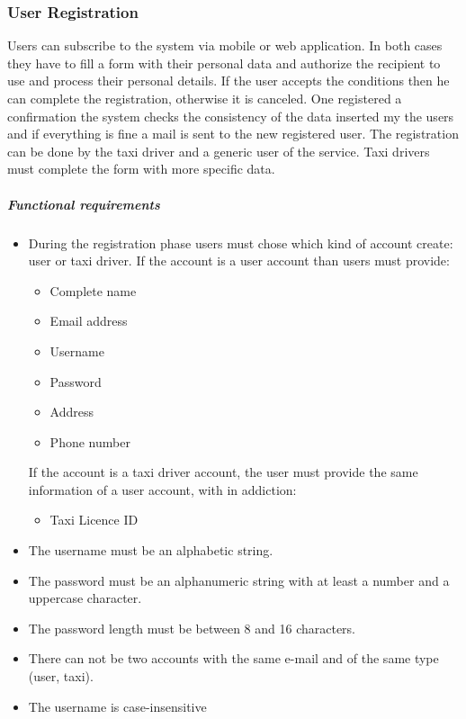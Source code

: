 \subsubsection{User Registration}
Users can subscribe to the system via mobile or web application. In both cases they have to fill a form with their personal data and authorize the recipient to use and process their personal details.
If the user accepts the conditions then he can complete the registration, otherwise it is canceled.
One registered a confirmation the system checks the consistency of the data inserted my the users and if everything is fine a mail is sent to the new registered user.
The registration can be done by the taxi driver and a generic user of the service. Taxi drivers must complete the form with more specific data.

	\subparagraph{Functional requirements}
	\noindent
		\begin{itemize}
			\item  During the registration phase users must chose which kind of account create: user or taxi driver.
			If the account is a user account than users must provide:
			\begin{itemize}
				\item Complete name
				\item Email address
				\item Username
				\item Password
				\item Address
				\item Phone number
			\end{itemize}
			If the account is a taxi driver account, the user must provide the same information of a user account, with in addiction:
			\begin{itemize}
				\item Taxi Licence ID
			\end{itemize}
			\item The username must be an alphabetic string.
			\item The password must be an alphanumeric string with at least a number and a uppercase character.
			\item The password length must be between 8 and 16 characters.
			\item There can not be two accounts with the same e-mail and of the same type (user, taxi).
			\item The username is case-insensitive
		\end{itemize}


